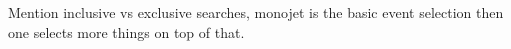 Mention inclusive vs exclusive searches, monojet is the basic event selection then one selects more things on top of that. 